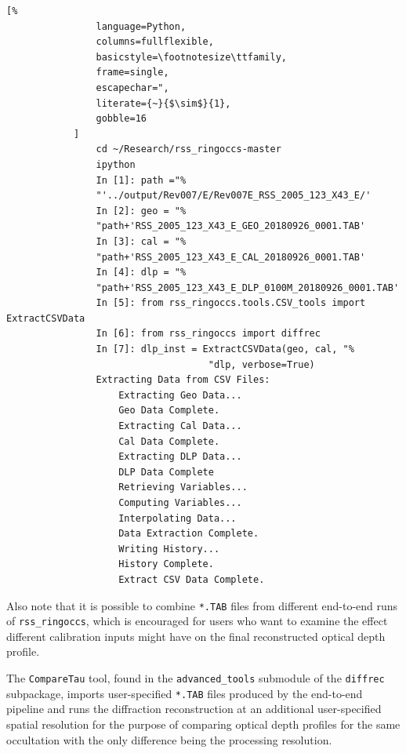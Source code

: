 \documentclass[titlepage, 12pt]{article}
\begin{document}
            \begin{lstlisting}[%
                language=Python,
                columns=fullflexible,
                basicstyle=\footnotesize\ttfamily,
                frame=single,
                escapechar=",
                literate={~}{$\sim$}{1},
                gobble=16
            ]
                cd ~/Research/rss_ringoccs-master
                ipython
                In [1]: path ="%
                "'../output/Rev007/E/Rev007E_RSS_2005_123_X43_E/'
                In [2]: geo = "%
                "path+'RSS_2005_123_X43_E_GEO_20180926_0001.TAB'
                In [3]: cal = "%
                "path+'RSS_2005_123_X43_E_CAL_20180926_0001.TAB'
                In [4]: dlp = "%
                "path+'RSS_2005_123_X43_E_DLP_0100M_20180926_0001.TAB'
                In [5]: from rss_ringoccs.tools.CSV_tools import ExtractCSVData
                In [6]: from rss_ringoccs import diffrec
                In [7]: dlp_inst = ExtractCSVData(geo, cal, "%
                                    "dlp, verbose=True)
                Extracting Data from CSV Files:
                    Extracting Geo Data...
                    Geo Data Complete.
                    Extracting Cal Data...
                    Cal Data Complete.
                    Extracting DLP Data...
                    DLP Data Complete
                    Retrieving Variables...
                    Computing Variables...
                    Interpolating Data...
                    Data Extraction Complete.
                    Writing History...
                    History Complete.
                    Extract CSV Data Complete.
            \end{lstlisting}
            Also note that it is possible to combine \texttt{*.TAB}
            files from different end-to-end runs of
            \texttt{rss\_ringoccs}, which is encouraged for users
            who want to examine the effect different calibration
            inputs might have on the final reconstructed
            optical depth profile.
            \par\hfill\par
            The \texttt{CompareTau} tool, found in the
            \texttt{advanced\_tools} submodule of the
            \texttt{diffrec} subpackage, imports user-specified
            \texttt{*.TAB} files produced by the end-to-end
            pipeline and runs the diffraction reconstruction at
            an additional user-specified spatial resolution for
            the purpose of comparing optical depth profiles for
            the same occultation with the only difference being
            the processing resolution.
            
\end{document}
